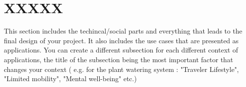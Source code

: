 \section{XXXXX}
This section includes the techincal/social parts and everything that leads to the final design of your project. It also includes the use cases that are presented as applications. You can create a different subsection for each different context of applications, the title of the subsection being the most important factor that changes your context ( e.g. for the plant watering system : "Traveler Lifestyle", "Limited mobility", "Mental well-being" etc.)